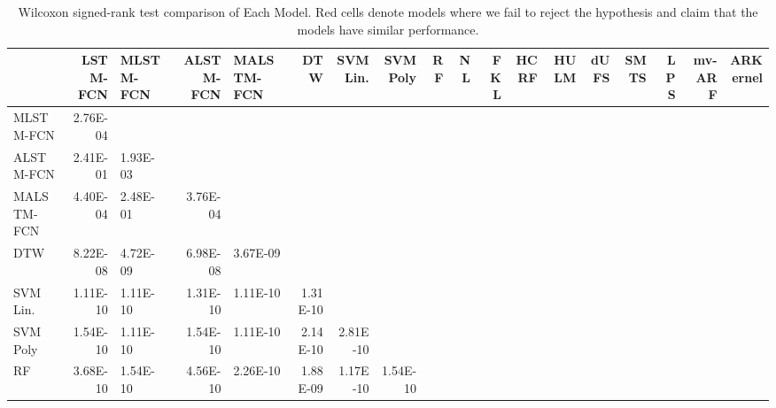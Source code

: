 \documentclass[preprint,12pt,3p]{elsarticle}
\begin{document}
\def\tabularxcolumn#1{m{#1}}


\begin{table*}[htpb]
\scriptsize
\centering
\caption{Wilcoxon signed-rank test comparison of Each Model. Red cells denote models where we fail to reject the hypothesis and claim that the models have similar performance.}
\label{tab:pvaltab}

\begin{adjustbox}{width=1 \textwidth, totalheight = 2.3in}

\begin{tabularx}{1.8 \textwidth}{|q|r|q|r|q|r|r|r|r|r|r|r|r|r|r|r|r|r|}
\hline
          & LSTM-FCN & MLSTM-FCN & ALSTM-FCN & MALSTM-FCN & DTW   & SVM Lin.   & SVM Poly  & RF    & NL    & FKL   & HCRF  & HULM  & dUFS  & SMTS  & LPS   & mv-ARF & ARKernel \\
    \hline
    MLSTM-FCN & 2.76E-04 &       &       &       &       &       &       &       &       &       &       &       &       &       &       &       &  \\
    \hline
    ALSTM-FCN & \textcolor[rgb]{ .612,  0,  .024}{2.41E-01} & 1.93E-03 &       &       &       &       &       &       &       &       &       &       &       &       &       &       &  \\
    \hline
    MALSTM-FCN & 4.40E-04 & \textcolor[rgb]{ .612,  0,  .024}{2.48E-01} & 3.76E-04 &       &       &       &       &       &       &       &       &       &       &       &       &       &  \\
    \hline
    DTW   & 8.22E-08 & 4.72E-09 & 6.98E-08 & 3.67E-09 &       &       &       &       &       &       &       &       &       &       &       &       &  \\
    \hline
    SVM Lin.   & 1.11E-10 & 1.11E-10 & 1.31E-10 & 1.11E-10 & 1.31E-10 &       &       &       &       &       &       &       &       &       &       &       &  \\
    \hline
    SVM Poly  & 1.54E-10 & 1.11E-10 & 1.54E-10 & 1.11E-10 & 2.14E-10 & 2.81E-10 &       &       &       &       &       &       &       &       &       &       &  \\
    \hline
    RF    & 3.68E-10 & 1.54E-10 & 4.56E-10 & 2.26E-10 & 1.88E-09 & 1.17E-10 & 1.54E-10 &       &       &       &       &       &       &       &       &       &  \\

\end{tabularx}
\end{adjustbox}
\end{table*}
\end{document}
